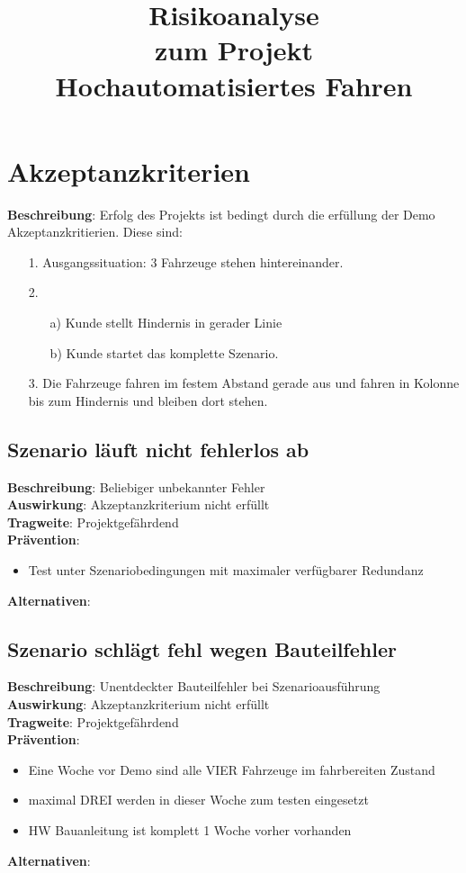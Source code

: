 \documentclass[a4paper, 12pt, titlepage]{scrartcl}
\begin{document}
\title{Risikoanalyse\\zum Projekt\\Hochautomatisiertes Fahren} 
\publishers{Humboldt-Universit\"at zu Berlin}
\maketitle
\tableofcontents
\newpage

\section{Akzeptanzkriterien}
\textbf{Beschreibung}: Erfolg des Projekts ist bedingt durch die erfüllung der Demo Akzeptanzkritierien. Diese sind:
		\begin{itemize}
			\item[1.] Ausgangssituation: 3 Fahrzeuge stehen hintereinander.
			\item[2.]
			\begin{itemize}
				\item[a)] Kunde stellt Hindernis in gerader Linie
				\item[b)] Kunde startet das komplette Szenario.
			\end{itemize}
			\item[3.] Die Fahrzeuge fahren im festem Abstand gerade aus und fahren in Kolonne bis zum Hindernis und bleiben dort stehen.
		\end{itemize}

	\subsection{Szenario läuft nicht fehlerlos ab}
		\textbf{Beschreibung}: Beliebiger unbekannter Fehler\\
		\textbf{Auswirkung}: Akzeptanzkriterium nicht erfüllt\\
		\textbf{Tragweite}: Projektgefährdend\\
		\textbf{Prävention}:
		\begin{itemize}
			\item Test unter Szenariobedingungen mit maximaler verfügbarer Redundanz
		\end{itemize}
		\textbf{Alternativen}: 

	\subsection{Szenario schlägt fehl wegen Bauteilfehler}
	\textbf{Beschreibung}: Unentdeckter Bauteilfehler bei Szenarioausführung\\
	\textbf{Auswirkung}: Akzeptanzkriterium nicht erfüllt\\
	\textbf{Tragweite}: Projektgefährdend\\
	\textbf{Prävention}: 
	\begin{itemize}
		\item Eine Woche vor Demo sind alle VIER Fahrzeuge im fahrbereiten Zustand
		\item maximal DREI werden in dieser Woche zum testen eingesetzt
		\item HW Bauanleitung ist komplett 1 Woche vorher vorhanden
	\end{itemize}
	\textbf{Alternativen}: 
\end{document}
